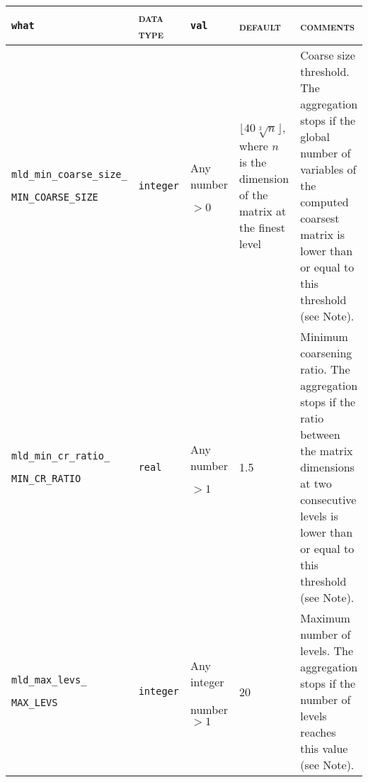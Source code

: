 \bsideways
\begin{center}
\begin{tabular}{|p{3.9cm}|l|p{2.3cm}|p{2.9cm}|p{6.9cm}|}
\hline
\verb|what|              & \textsc{data type}        &  \verb|val|      &  \textsc{default}  &
\textsc{comments} \\ \hline
\verb|mld_min_coarse_size_|  \par \verb|MIN_COARSE_SIZE| & \verb|integer|
                         & Any number \par $> 0$
                         & $\lfloor 40 \sqrt[3]{n} \rfloor$, where $n$ is the dimension
                            of the matrix at the finest level
                         & Coarse size threshold. The aggregation stops
                            if  the global number of variables of the
                            computed coarsest matrix
                            is lower than or equal to this threshold
                           (see Note).
                           \\ \hline  
\verb|mld_min_cr_ratio_|  \par \verb|MIN_CR_RATIO| & \verb|real|
                         & Any number \par $> 1$
                         & 1.5
                         & Minimum coarsening ratio. The aggregation stops
                            if the ratio between the matrix dimensions
                            at two consecutive levels is lower than or equal to this
                            threshold (see Note).\\ \hline   
\verb|mld_max_levs_|  \par \verb|MAX_LEVS| & \verb|integer|
                         & Any integer \par number $> 1$
                         & 20
                         & Maximum number of levels. The aggregation stops
                           if the number of levels reaches this value (see Note). \\ \hline  

\end{tabular}
\end{center}
